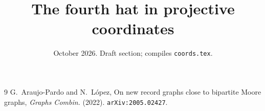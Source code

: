\documentclass[11pt]{amsart}
\title{The fourth hat in projective coordinates}
\date{October 2026. Draft section; compiles \texttt{coords.tex}.}
\theoremstyle{remark}
\begin{document}
\maketitle

\begin{thebibliography}{9}
 G.~Araujo-Pardo and N.~L\'opez, On new record graphs close to bipartite Moore graphs, \emph{Graphs Combin.} (2022). \texttt{arXiv:2005.02427}.
\end{thebibliography}
\end{document}
